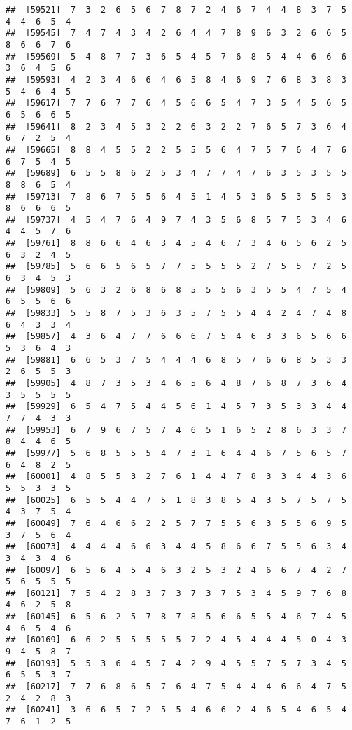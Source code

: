 \documentclass[
]{book}
\begin{document}
\begin{verbatim}
##  [59521]  7  3  2  6  5  6  7  8  7  2  4  6  7  4  4  8  3  7  5  4  4  6  5  4
##  [59545]  7  4  7  4  3  4  2  6  4  4  7  8  9  6  3  2  6  6  5  8  6  6  7  6
##  [59569]  5  4  8  7  7  3  6  5  4  5  7  6  8  5  4  4  6  6  6  3  6  4  5  6
##  [59593]  4  2  3  4  6  6  4  6  5  8  4  6  9  7  6  8  3  8  3  5  4  6  4  5
##  [59617]  7  7  6  7  7  6  4  5  6  6  5  4  7  3  5  4  5  6  5  6  5  6  6  5
##  [59641]  8  2  3  4  5  3  2  2  6  3  2  2  7  6  5  7  3  6  4  6  7  2  5  4
##  [59665]  8  8  4  5  5  2  2  5  5  5  6  4  7  5  7  6  4  7  6  6  7  5  4  5
##  [59689]  6  5  5  8  6  2  5  3  4  7  7  4  7  6  3  5  3  5  5  8  8  6  5  4
##  [59713]  7  8  6  7  5  5  6  4  5  1  4  5  3  6  5  3  5  5  3  8  6  6  6  5
##  [59737]  4  5  4  7  6  4  9  7  4  3  5  6  8  5  7  5  3  4  6  4  4  5  7  6
##  [59761]  8  8  6  6  4  6  3  4  5  4  6  7  3  4  6  5  6  2  5  6  3  2  4  5
##  [59785]  5  6  6  5  6  5  7  7  5  5  5  5  2  7  5  5  7  2  5  6  3  4  5  3
##  [59809]  5  6  3  2  6  8  6  8  5  5  5  6  3  5  5  4  7  5  4  6  5  5  6  6
##  [59833]  5  5  8  7  5  3  6  3  5  7  5  5  4  4  2  4  7  4  8  6  4  3  3  4
##  [59857]  4  3  6  4  7  7  6  6  6  7  5  4  6  3  3  6  5  6  6  5  3  6  4  3
##  [59881]  6  6  5  3  7  5  4  4  4  6  8  5  7  6  6  8  5  3  3  2  6  5  5  3
##  [59905]  4  8  7  3  5  3  4  6  5  6  4  8  7  6  8  7  3  6  4  3  5  5  5  5
##  [59929]  6  5  4  7  5  4  4  5  6  1  4  5  7  3  5  3  3  4  4  7  7  4  3  3
##  [59953]  6  7  9  6  7  5  7  4  6  5  1  6  5  2  8  6  3  3  7  8  4  4  6  5
##  [59977]  5  6  8  5  5  5  4  7  3  1  6  4  4  6  7  5  6  5  7  6  4  8  2  5
##  [60001]  4  8  5  5  3  2  7  6  1  4  4  7  8  3  3  4  4  3  6  5  5  3  3  5
##  [60025]  6  5  5  4  4  7  5  1  8  3  8  5  4  3  5  7  5  7  5  4  3  7  5  4
##  [60049]  7  6  4  6  6  2  2  5  7  7  5  5  6  3  5  5  6  9  5  3  7  5  6  4
##  [60073]  4  4  4  4  6  6  3  4  4  5  8  6  6  7  5  5  6  3  4  3  4  3  4  6
##  [60097]  6  5  6  4  5  4  6  3  2  5  3  2  4  6  6  7  4  2  7  5  6  5  5  5
##  [60121]  7  5  4  2  8  3  7  3  7  3  7  5  3  4  5  9  7  6  8  4  6  2  5  8
##  [60145]  6  5  6  2  5  7  8  7  8  5  6  6  5  5  4  6  7  4  5  4  6  5  4  6
##  [60169]  6  6  2  5  5  5  5  5  7  2  4  5  4  4  4  5  0  4  3  9  4  5  8  7
##  [60193]  5  5  3  6  4  5  7  4  2  9  4  5  5  7  5  7  3  4  5  6  5  5  3  7
##  [60217]  7  7  6  8  6  5  7  6  4  7  5  4  4  4  6  6  4  7  5  2  4  2  8  3
##  [60241]  3  6  6  5  7  2  5  5  4  6  6  2  4  6  5  4  6  5  4  7  6  1  2  5

\end{verbatim}
\end{document}
